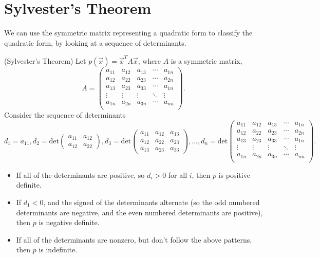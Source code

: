 \documentclass{ximera}
\begin{document}
\section*{Sylvester's Theorem}

We can use the symmetric matrix representing a quadratic form to classify the quadratic form, by looking at a sequence of determinants.

\begin{theorem}
(Sylvester's Theorem) Let $p(\vec{x}) = \vec{x}^TA\vec{x}$, where $A$ is a symmetric matrix, 
\[
A = \begin{pmatrix}
a_{11} & a_{12} & a_{13} & \cdots & a_{1n}\\
a_{12} & a_{22} & a_{23} & \cdots & a_{2n}\\
a_{13} & a_{23} & a_{33} & \cdots & a_{1n}\\
\vdots & \vdots & \vdots & \ddots & \vdots\\
a_{1n} & a_{2n} & a_{3n} & \cdots & a_{nn}\\
\end{pmatrix}.
\]
Consider the sequence of determinants
\[
d_1 = a_{11}, d_2 = \text{det}\begin{pmatrix}a_{11} & a_{12}\\ a_{12} & a_{22}\end{pmatrix}, d_3 = \text{det}\begin{pmatrix}a_{11} & a_{12} & a_{13}\\ a_{12} & a_{22} & a_{23}\\ a_{13} & a_{23} & a_{33}\end{pmatrix},...,d_n = \text{det}\begin{pmatrix}
a_{11} & a_{12} & a_{13} & \cdots & a_{1n}\\
a_{12} & a_{22} & a_{23} & \cdots & a_{2n}\\
a_{13} & a_{23} & a_{33} & \cdots & a_{1n}\\
\vdots & \vdots & \vdots & \ddots & \vdots\\
a_{1n} & a_{2n} & a_{3n} & \cdots & a_{nn}\\
\end{pmatrix}.
\]
\begin{itemize}
\item If all of the determinants are positive, so $d_i>0$ for all $i$, then $p$ is positive definite.
\item If $d_1 < 0$, and the signed of the determinants alternate (so the odd numbered determinants are negative, and the even numbered determinants are positive), then $p$ is negative definite.
\item If all of the determinants are nonzero, but don't follow the above patterns, then $p$ is indefinite.
\end{itemize}
\end{theorem}
\end{document}

